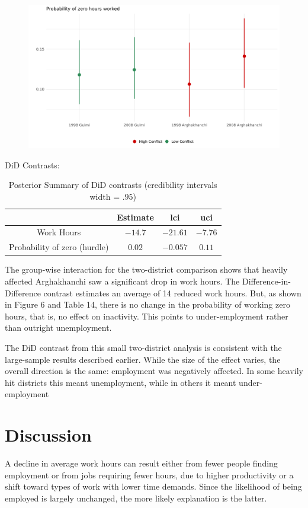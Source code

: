 \documentclass[12pt,a4paper]{article}
\providecommand{\tabularnewline}{\\}
\begin{document}
\begin{figure}[H]
	\centering
	\includegraphics[width=1\textwidth]{../Analysis files/coefplot_map_hu.jpg}
	\caption{}
	\label{fig:coefplot_map_hu}
\end{figure}

DiD Contrasts:

\begin{table}[H]
	\caption{Posterior Summary of DiD contrasts (credibility intervals width = $.95$)}
	
	\renewcommand{\arraystretch}{1.2}
	\vspace{1em}
	\centering{}%
	\begin{tabular}{c|c|c|c|}
		& Estimate & lci& uci \tabularnewline
		\hline 
		Work Hours & $-14.7$ & $-21.61$ & $-7.76$ \tabularnewline
		Probability of zero (hurdle) & $0.02$ & $-0.057$ & $0.11$ \tabularnewline
		\hline 
	\end{tabular}
\end{table}

The group-wise interaction for the two-district comparison shows that heavily affected Arghakhanchi saw a significant drop in work hours. The Difference-in-Difference contrast estimates an average of 14 reduced work hours. But, as shown in Figure 6 and Table 14, there is no change in the probability of working zero hours, that is, no effect on inactivity. This points to under-employment rather than outright unemployment.

The DiD contrast from this small two-district analysis is consistent with the large-sample results described earlier. While the size of the effect varies, the overall direction is the same: employment was negatively affected. In some heavily hit districts this meant unemployment, while in others it meant under-employment

\section{Discussion}
A decline in average work hours can result either from fewer people finding employment or from jobs requiring fewer hours, due to higher productivity or a shift toward types of work with lower time demands. Since the likelihood of being employed is largely unchanged, the more likely explanation is the latter.
\end{document}
